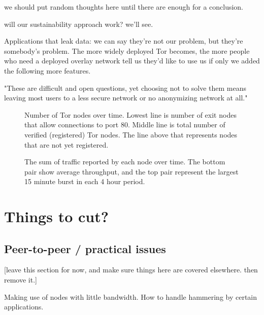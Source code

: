 \documentclass{llncs}
\begin{document}
we should put random thoughts here until there are enough for a
conclusion.

will our sustainability approach work? we'll see.

Applications that leak data: we can say they're not our problem, but
they're somebody's problem.
The more widely deployed Tor becomes, the more people who need a
deployed overlay network tell us they'd like to use us if only we added
the following more features.

"These are difficult and open questions, yet choosing not to solve them
means leaving most users to a less secure network or no anonymizing
network at all."

 

\clearpage
\appendix

\begin{figure}[t]
\centering
\mbox{}
\caption{Number of Tor nodes over time. Lowest line is number of exit
nodes that allow connections to port 80. Middle line is total number of
verified (registered) Tor nodes. The line above that represents nodes
that are not yet registered.}
\label{fig:graphnodes}
\end{figure}

\begin{figure}[t]
\centering
\mbox{}
\caption{The sum of traffic reported by each node over time. The bottom
pair show average throughput, and the top pair represent the largest 15
minute burst in each 4 hour period.}
\label{fig:graphtraffic}
\end{figure}


\section{Things to cut?}
\subsection{Peer-to-peer / practical issues}

[leave this section for now, and make sure things here are covered
elsewhere. then remove it.]

Making use of nodes with little bandwidth. How to handle hammering by
certain applications.
\end{document}
